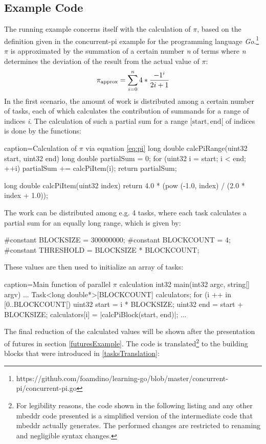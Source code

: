 \subsection{Example Code}
\label{taskExample}
The running example concerns itself with the calculation of $\pi$, based on the definition given in the concurrent-pi example for the programming language \textit{Go}.\footnote{https://github.com/foamdino/learning-go/blob/master/concurrent-pi/concurrent-pi.go} $\pi$ is approximated by the summation of a certain number \textit{n} of terms where \textit{n} determines the deviation of the result from the actual value of $\pi$: 
\begin{equation}\label{eq:pi}
{\pi}_{\mathrm{approx}} = \sum\limits_{i=0}^{n}4*{-1^i \over 2i+1}
\end{equation}
In the first scenario, the amount of work is distributed among a certain number of tasks, each of which calculates the contribution of summands for a range of indices \textit{i}. The calculation of such a partial sum for a range $[\mathrm{start}, \mathrm{end}[$ of indices is done by the functions:
\begin{ccode}{caption=Calculation of $\pi$ via equation \ref{eq:pi}}
long double calcPiRange(uint32 start, uint32 end) { 
  long double partialSum = 0; 
  for (uint32 i = start; i < end; ++i) { 
    partialSum += calcPiItem(i); 
  }
  return partialSum; 
}
 
long double calcPiItem(uint32 index) { 
  return 4.0 * (pow (-1.0, index) / (2.0 * index + 1.0)); 
}
\end{ccode}
The work can be distributed among e.g. 4 tasks, where each task calculates a partial sum for an equally long range, which is given by:
\begin{ccode}{}
#constant BLOCKSIZE = 300000000;
#constant BLOCKCOUNT = 4; 
#constant THRESHOLD = BLOCKSIZE * BLOCKCOUNT;
\end{ccode}
These values are then used to initialize an array of tasks:
\begin{ccode}{caption=Main function of parallel $\pi$ calculation}
int32 main(int32 argc, string[] argv) {
  ...
  Task<long double*>[BLOCKCOUNT] calculators;
  for (i ++ in [0..BLOCKCOUNT[) { 
    uint32 start = i * BLOCKSIZE; 
    uint32 end = start + BLOCKSIZE; 
    calculators[i] = |calcPiBlock(start, end)|; 
  } ...
}
\end{ccode}
The final reduction of the calculated values will be shown after the presentation of futures in section \ref{futuresExample}. The code is translated\footnote{For legibility reasons, the code shown in the following listing and any other mbeddr code presented is a simplified version of the intermediate code that mbeddr actually generates. The performed changes are restricted to renaming and negligible syntax changes.} to the building blocks that were introduced in \ref{tasksTranslation}:
